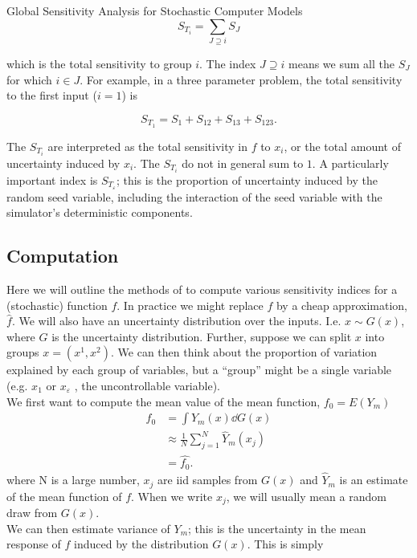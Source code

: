 \begin{chapter}{Global Sensitivity Analysis for Stochastic Computer Models}
\begin{equation}
	S_{T_i} = \sum_{J \supseteq i} S_J 
\end{equation}

which is the total sensitivity to group $i$. The index ${J \supseteq i}$ means we sum all the $S_J$ for which $i \in J$. For example, in a three parameter problem, the total sensitivity to the first input ($i = 1$) is

\begin{equation}
	S_{T_1} = S_1 + S_{12} + S_{13} + S_{123}.
\end{equation}

The $S_{T_i}$ are interpreted as the total sensitivity in $f$ to $x_i$, or the total amount of uncertainty induced by $x_i$. The $S_{T_i}$ do not in general sum to $1$. A particularly important index is $S_{T_\varepsilon}$; this is the proportion of uncertainty induced by the random seed variable, including the interaction of the seed variable with the simulator's deterministic components.
\subsection{Computation}

Here we will outline the methods of \citet{Sobol1993} to compute various sensitivity indices for a (stochastic) function $f$. In practice we might replace $f$ by a cheap approximation, $\hat{f}$. We will also have an uncertainty distribution over the inputs. I.e. $x \sim G(x)$, where $G$ is the uncertainty distribution. Further, suppose we can split $x$ into groups $x = (x^1, x^2)$. We can then think about the proportion of variation explained by each group of variables, but a ``group'' might be a single variable (e.g. $x_1$ or $x_\varepsilon$ , the uncontrollable variable).\\

We first want to compute the mean value of the mean function, $f_0 = E(Y_m)$
\begin{align*}
f_0 & = \int Y_m(x) \dd G(x) \\
& \approx \frac{1}{N} \sum_{j = 1}^N \hat{Y}_m (x_j)\\
& = \hat{f_0}.
\end{align*}
where N is a large number, $x_j$ are iid samples from $G(x)$ and $\hat{Y}_m$ is an estimate of the mean function of $f$. When we write $x_j$, we will usually mean a random draw from $G(x)$.\\

We can then estimate variance of $Y_m$; this is the uncertainty in the mean response of $f$ induced by the distribution $G(x)$. This is simply


\end{chapter}
